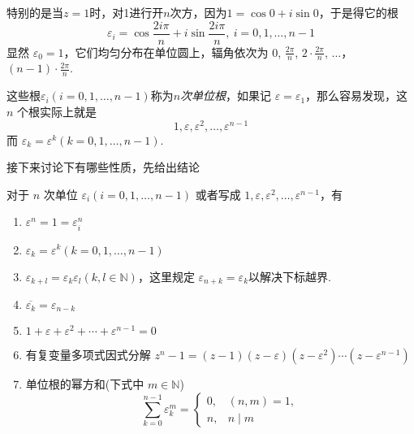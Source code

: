 特别的是当$z=1$时，对1进行开$n$次方，因为$1=\cos{0}+i\sin{0}$，于是得它的根
\[ \varepsilon_i = \cos{\frac{2i\pi}{n}}+i\sin{\frac{2i\pi}{n}}, \  i=0,1,\ldots,n-1 \]
显然 $\varepsilon_0=1$，它们均匀分布在单位圆上，辐角依次为 $0$, $\frac{2\pi}{n}$, $2\cdot \frac{2\pi}{n}$, $\ldots$，$(n-1)\cdot \frac{2\pi}{n}$.

这些根$\varepsilon_i(i=0,1,\ldots,n-1)$称为\emph{$n$次单位根}，如果记 $\varepsilon=\varepsilon_1$，那么容易发现，这 $n$ 个根实际上就是
\[ 1, \varepsilon, \varepsilon^2, \ldots, \varepsilon^{n-1} \]
而 $\varepsilon_k=\varepsilon^k(k=0,1,\ldots,n-1)$.

接下来讨论下有哪些性质，先给出结论
\begin{property}
  对于 $n$ 次单位 $\varepsilon_i(i=0,1,\ldots,n-1)$ 或者写成 $1,\varepsilon, \varepsilon^2, \ldots, \varepsilon^{n-1}$，有
  \begin{enumerate}
  \item $\varepsilon^n=1=\varepsilon_i^n$
  \item $\varepsilon_k=\varepsilon^k(k=0,1,\ldots,n-1)$
  \item $\varepsilon_{k+l}=\varepsilon_k\varepsilon_l(k,l\in \mathbb{N})$，这里规定 $\varepsilon_{n+k}=\varepsilon_{k}$以解决下标越界.
  \item $\overline{\varepsilon_k}=\varepsilon_{n-k}$
  \item $1+\varepsilon+\varepsilon^2+\cdots+\varepsilon^{n-1}=0$
  \item 有复变量多项式因式分解 $z^n-1=(z-1)(z-\varepsilon)(z-\varepsilon^2)\cdots (z-\varepsilon^{n-1})$
  \item 单位根的幂方和(下式中 $m \in \mathbb{N}$)
    \[
      \sum_{k=0}^{n-1}\varepsilon_k^m =
      \begin{cases}
        0, & (n,m)=1, \\
        n, & n \mid m
      \end{cases}
    \]
  \end{enumerate}
\end{property}

